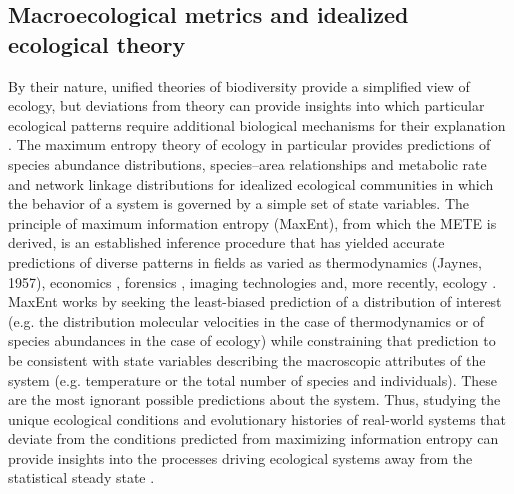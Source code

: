 \subsection{Macroecological metrics and idealized ecological theory}

By their nature, unified theories of biodiversity
\citep[e.g.][]{hubbell2001, harte2011} provide a simplified view of
ecology, but deviations from theory can provide insights into which
particular ecological patterns require additional biological
mechanisms for their explanation \citep{harte2011}. The maximum
entropy theory of ecology \citep[METE;][]{harte2011} in particular
provides predictions of species abundance distributions, species–area
relationships and metabolic rate and network linkage distributions for
idealized ecological communities in which the behavior of a system is
governed by a simple set of state variables. The principle of maximum
information entropy (MaxEnt), from which the METE is derived, is an
established inference procedure that has yielded accurate predictions
of diverse patterns in fields as varied as thermodynamics (Jaynes,
1957), economics \citep{golan1996}, forensics \citep{roussev2010},
imaging technologies \citep{gull1986} and, more recently, ecology
\citep[e.g.][]{phillips2006, dewar2008, harte2011}. MaxEnt works by
seeking the least-biased prediction of a distribution of interest
(e.g. the distribution molecular velocities in the case of
thermodynamics or of species abundances in the case of ecology) while
constraining that prediction to be consistent with state variables
describing the macroscopic attributes of the system (e.g. temperature
or the total number of species and individuals). These are the most
ignorant possible predictions about the system. Thus, studying the
unique ecological conditions and evolutionary histories of real-world
systems that deviate from the conditions predicted from maximizing
information entropy can provide insights into the processes driving
ecological systems away from the statistical steady state
\citep{harte2011}.


